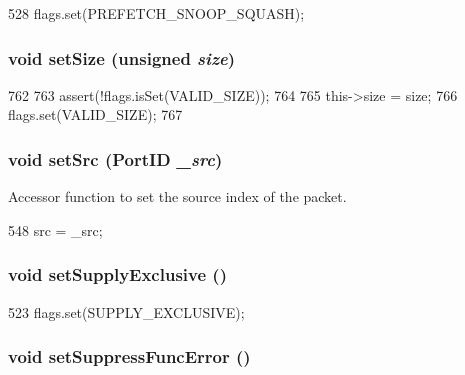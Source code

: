 \begin{DoxyCode}
528 { flags.set(PREFETCH_SNOOP_SQUASH); }
\end{DoxyCode}
\hypertarget{classPacket_a9ad6fec061170a98f1358fc86738e7b3}{
\subsubsection[{setSize}]{\setlength{\rightskip}{0pt plus 5cm}void setSize (unsigned {\em size})}}
\label{classPacket_a9ad6fec061170a98f1358fc86738e7b3}



\begin{DoxyCode}
762     {
763         assert(!flags.isSet(VALID_SIZE));
764 
765         this->size = size;
766         flags.set(VALID_SIZE);
767     }
\end{DoxyCode}
\hypertarget{classPacket_a6e173cf473a751a0e969c1561a4184cc}{
\subsubsection[{setSrc}]{\setlength{\rightskip}{0pt plus 5cm}void setSrc ({\bf PortID} {\em \_\-src})}}
\label{classPacket_a6e173cf473a751a0e969c1561a4184cc}


Accessor function to set the source index of the packet. 


\begin{DoxyCode}
548 { src = _src; }
\end{DoxyCode}
\hypertarget{classPacket_ad0e298222c7b6801ea282a177fac7c39}{
\subsubsection[{setSupplyExclusive}]{\setlength{\rightskip}{0pt plus 5cm}void setSupplyExclusive ()}}
\label{classPacket_ad0e298222c7b6801ea282a177fac7c39}



\begin{DoxyCode}
523 { flags.set(SUPPLY_EXCLUSIVE); }
\end{DoxyCode}
\hypertarget{classPacket_ad0ca097f61c7d5d16df21635617d8d07}{
\subsubsection[{setSuppressFuncError}]{\setlength{\rightskip}{0pt plus 5cm}void setSuppressFuncError ()}}
\label{classPacket_ad0ca097f61c7d5d16df21635617d8d07}



